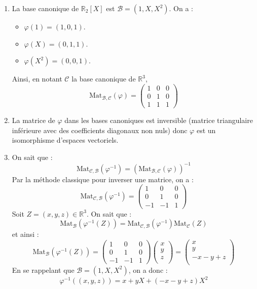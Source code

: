\documentclass[a4paper,10pt]{report}
\begin{document}
\corr \begin{enumerate}
\item La base canonique de $\mathbb{R}_2[X]$ est $\mathcal{B}=(1,X,X^2)$. On a :
\begin{itemize}
\item $\varphi(1) = (1,0,1)$.
\item $\varphi(X) = (0, 1, 1)$. 
\item $\varphi(X^2) = (0, 0, 1)$.
\end{itemize}
Ainsi, en notant $\mathcal{C}$ la base canonique de $\mathbb{R}^3$,
$$ \textrm{Mat}_{\mathcal{B}, \mathcal{C}}(\varphi) = \begin{pmatrix}
1 & 0 & 0 \\
0 & 1 & 0 \\
1 & 1 & 1 
\end{pmatrix}$$
\item La matrice de $\varphi$ dans les bases canoniques est inversible (matrice triangulaire inférieure avec des coefficients diagonaux non nuls) donc $\varphi$ est un isomorphisme d'espaces vectoriels. 

\item On sait que :
$$ \textrm{Mat}_{\mathcal{C}, \mathcal{B}}(\varphi^{-1}) = (\textrm{Mat}_{\mathcal{B}, \mathcal{C}}(\varphi))^{-1}$$
Par la méthode classique pour inverser une matrice, on a :
$$\textrm{Mat}_{\mathcal{C}, \mathcal{B}}(\varphi^{-1}) = \begin{pmatrix}
1 & 0 & 0 \\
0 & 1 & 0 \\
-1 & -1 & 1 
\end{pmatrix}$$
Soit $Z=(x,y,z) \in \mathbb{R}^3$. On sait que :
$$ \textrm{Mat}_{\mathcal{B}}(\varphi^{-1}(Z)) = \textrm{Mat}_{\mathcal{C}, \mathcal{B}}(\varphi^{-1}) \textrm{Mat}_{\mathcal{C}}(Z)$$
et ainsi :
$$ \textrm{Mat}_{\mathcal{B}}(\varphi^{-1}(Z)) = \begin{pmatrix}
1 & 0 & 0 \\
0 & 1 & 0 \\
-1 & -1 & 1 
\end{pmatrix} \begin{pmatrix}
x \\
y \\
z \\
\end{pmatrix} = \begin{pmatrix}
x \\
y \\
-x-y+z \\
\end{pmatrix}$$
En se rappelant que $\mathcal{B}=(1,X,X^2)$, on a donc :
$$ \varphi^{-1}((x,y,z)) = x + y X + (-x-y+z)X^2$$
\end{enumerate}
\end{document}
